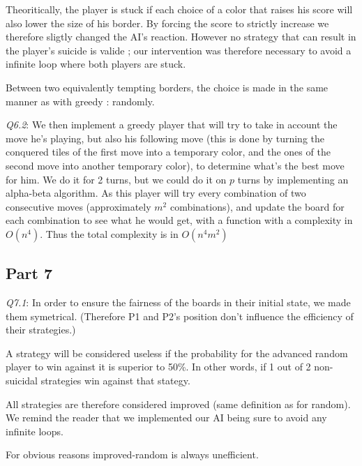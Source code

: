 \documentclass[a4paper]{article}
\begin{document}
 Theoritically, the player is stuck if each choice of a color that raises his score will also lower the size of his border. By forcing the score
  to strictly increase we therefore sligtly changed the AI's reaction. However no strategy that can result in the player's suicide is valide ; our
  intervention was therefore necessary to avoid a infinite loop where both players are stuck.
  
  Between two equivalently tempting borders, the choice is made in the same manner as with greedy : randomly.\newline
 
 \emph{Q6.2}: We then implement a greedy player that will try to take in account the move he's playing, but also his following move (this is done by turning the conquered tiles of the first move into a temporary color, and the ones of the second move into another temporary color), to determine what's the best move for him. We do it for 2 turns, but we could do it on $p$ turns by implementing an alpha-beta algorithm.
 As this player will try every combination of two consecutive moves (approximately $m^2$ combinations), and update the board for each combination to see what he would get, with a function with a complexity in $O(n^4)$. Thus the total complexity is in $O(n^4m^2)$ \newline
 
 \subsection{Part 7}
 
 \emph{Q7.1}: 	In order to ensure the fairness of the boards in their initial state, we made them symetrical. (Therefore P1
 and P2's position don't influence the efficiency of their strategies.)
 
A strategy will be considered useless if the probability for the advanced random player to win against it is superior to 50\%.
In other words, if 1 out of 2 non-suicidal strategies win against that stategy.

All strategies are therefore considered improved (same definition as for random). We remind the reader that we implemented our AI being sure to avoid any infinite loops.\newline

For obvious reasons improved-random is always unefficient.
\end{document}
